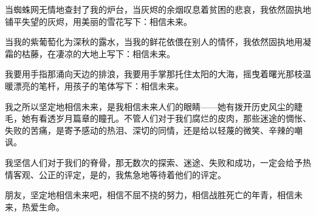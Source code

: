 
\acknowledgement
   
当蜘蛛网无情地查封了我的炉台，当灰烬的余烟叹息着贫困的悲哀，我依然固执地铺平失望的灰烬，用美丽的雪花写下：相信未来。

当我的紫葡萄化为深秋的露水，当我的鲜花依偎在别人的情怀，我依然固执地用凝霜的枯藤，在凄凉的大地上写下：相信未来。

我要用手指那涌向天边的排浪，我要用手掌那托住太阳的大海，摇曳着曙光那枝温暖漂亮的笔杆，用孩子的笔体写下：相信未来。

我之所以坚定地相信未来，是我相信未来人们的眼睛——她有拨开历史风尘的睫毛，她有看透岁月篇章的瞳孔。不管人们对于我们腐烂的皮肉，那些迷途的惆怅、失败的苦痛，是寄予感动的热泪、深切的同情，还是给以轻蔑的微笑、辛辣的嘲讽。

我坚信人们对于我们的脊骨，那无数次的探索、迷途、失败和成功，一定会给予热情客观、公正的评定，是的，我焦急地等待着他们的评定。

朋友，坚定地相信未来吧，相信不屈不挠的努力，相信战胜死亡的年青，相信未来，热爱生命。

